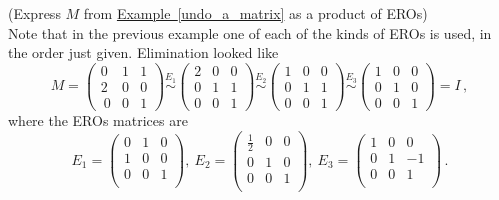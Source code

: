 \begin{example} (Express $M$ from  
\hyperlink{undo a matrix}{Example~\ref{undo_a_matrix}} as a product of EROs)\\
Note that in the previous example 
one of each of the kinds of EROs is used, in the order just given.
Elimination looked like 
\[
M=
\left(\begin{array}{ccc}
0 & 1 & 1 \\ 
2 & 0 & 0 \\\
0& 0 & 1  
\end{array}  \right)
\stackrel{E_1}{\sim}
\left(\begin{array}{ccc}
2 & 0 & 0 \\
0 & 1 & 1 \\ 
0& 0 & 1  
\end{array}  \right)
\stackrel{E_2}{\sim}
\left(\begin{array}{ccc}
1 & 0 & 0 \\
0 & 1 & 1 \\ 
0& 0 & 1  
\end{array}  \right)
\stackrel{E_3}{\sim}
\left(\begin{array}{ccc}
1 & 0 & 0 \\
0 & 1 & 0 \\ 
0& 0 & 1  
\end{array}  \right)
=I\, ,
\]
where the EROs matrices are 
\[
E_1
= \left(\begin{array}{ccc}
0  &1 &0\\
1  &0 &0\\ 
0  &0 &1\\
\end{array}  \right)
,~
E_2
= \left(\begin{array}{ccc}
\frac12  &0 &0\\
0  &1 &0\\ 
0  &0 &1\\
\end{array}  \right) , ~
E_3
= \left(\begin{array}{ccc}
1  &0 &0\\
0  &1 & -1\\ 
0  &0 &1\\
\end{array}  \right) \,.
\]

\end{example}
